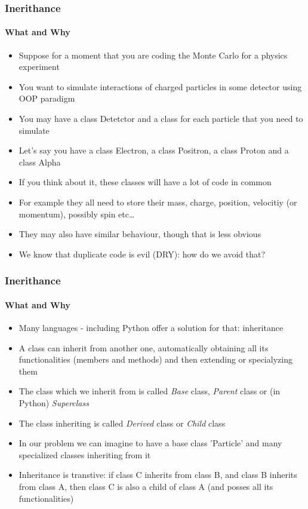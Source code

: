 \documentclass[9pt]{beamer}
\begin{document}
\begin{frame}
  \frametitle{Inerithance}
  \framesubtitle{What and Why}
    
  \begin{itemize}
    \small
    \item Suppose for a moment that you are coding the Monte Carlo for a physics experiment
    \medskip
    \item You want to simulate interactions of charged particles in some detector using OOP paradigm
    \medskip
    \item You may have a class Detetctor and a class for each particle that you need to simulate
    \medskip
    \item Let's say you have a class Electron, a class Positron, a class Proton and a class Alpha
    \medskip
    \item If you think about it, these classes will have a lot of code in common
    \medskip
    \item For example they all need to store their mass, charge, position, velocitiy (or momentum), possibly spin etc\dots
    \medskip
    \item They may also have similar behaviour, though that is less obvious
    \medskip
    \item We know that duplicate code is evil (DRY): how do we avoid that?
  \end{itemize}
  
\end{frame}


\begin{frame}
  \frametitle{Inerithance}
  \framesubtitle{What and Why}
    
  \begin{itemize}
    \small
    \item Many languages - including Python offer a solution for that: \alert{inheritance}
    \medskip
    \item A class can inherit from another one, automatically obtaining all its functionalities (members and methods) and
          then extending or specialyzing them
    \medskip
    \item The class which we inherit from is called \emph{Base} class, \emph{Parent} class or (in Python) \emph{Superclass}
    \medskip
    \item The class inheriting is called \emph{Derived} class or \emph{Child} class
    \medskip
    \item In our problem we can imagine to have a base class 'Particle' and many specialized classes inheriting from it
    \medskip
    \item Inheritance is transtive: if class C inherits from class B, and class B inherits from class A, then 
          class C is also a child of class A (and posses all its functionalities)
  \end{itemize}
  
\end{frame}
\end{document}
